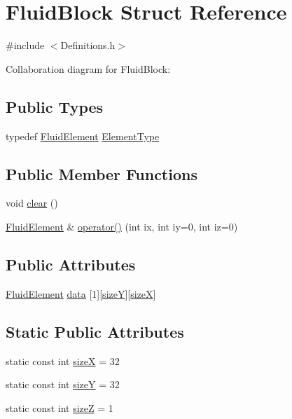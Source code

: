 \hypertarget{struct_fluid_block}{}\section{Fluid\+Block Struct Reference}
\label{struct_fluid_block}


{\ttfamily \#include $<$Definitions.\+h$>$}



Collaboration diagram for Fluid\+Block\+:
\subsection*{Public Types}
\begin{DoxyCompactItemize}
\item 
typedef \hyperlink{struct_fluid_element}{Fluid\+Element} \hyperlink{struct_fluid_block_ada33fbdab33f2688d3eb632118de5a6e}{Element\+Type}
\end{DoxyCompactItemize}
\subsection*{Public Member Functions}
\begin{DoxyCompactItemize}
\item 
void \hyperlink{struct_fluid_block_af2c2703f49640b00d0757ab6d22bdec9}{clear} ()
\item 
\hyperlink{struct_fluid_element}{Fluid\+Element} \& \hyperlink{struct_fluid_block_a0cc6dc89e9a9a3b9c1b61eda26a041eb}{operator()} (int ix, int iy=0, int iz=0)
\end{DoxyCompactItemize}
\subsection*{Public Attributes}
\begin{DoxyCompactItemize}
\item 
\hyperlink{struct_fluid_element}{Fluid\+Element} \hyperlink{struct_fluid_block_adaf63688f4901ef6640e3ee02aeabf42}{data} \mbox{[}1\mbox{]}\mbox{[}\hyperlink{struct_fluid_block_afd21ed464f6732be798bba7d87113bd2}{size\+Y}\mbox{]}\mbox{[}\hyperlink{struct_fluid_block_a4894f513519efdad2837a01cfb65f42e}{size\+X}\mbox{]}
\end{DoxyCompactItemize}
\subsection*{Static Public Attributes}
\begin{DoxyCompactItemize}
\item 
static const int \hyperlink{struct_fluid_block_a4894f513519efdad2837a01cfb65f42e}{size\+X} = 32
\item 
static const int \hyperlink{struct_fluid_block_afd21ed464f6732be798bba7d87113bd2}{size\+Y} = 32
\item 
static const int \hyperlink{struct_fluid_block_a7876602d8791ed7d4734fa20ad0a9574}{size\+Z} = 1
\end{DoxyCompactItemize}


